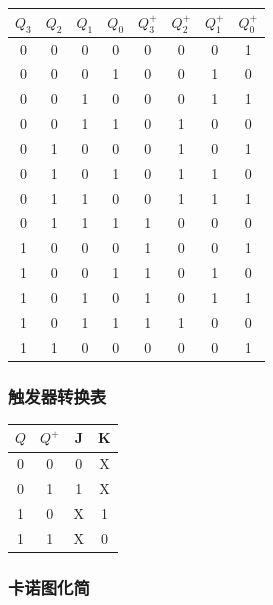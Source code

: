 \documentclass{article}
\begin{document}
\begin{table}[!hbp]
\centering
\begin{tabular}{|c|c|c|c||c|c|c|c|}
\hline
$Q_3$ & $Q_2$ & $Q_1$ & $Q_0$ & $Q_3^+$ & $Q_2^+$ & $Q_1^+$ & $Q_0^+$ \\
\hline
\hline
0 & 0 & 0 & 0 & 0 & 0 & 0 & 1 \\
\hline
0 & 0 & 0 & 1 & 0 & 0 & 1 & 0 \\
\hline
0 & 0 & 1 & 0 & 0 & 0 & 1 & 1 \\
\hline
0 & 0 & 1 & 1 & 0 & 1 & 0 & 0 \\
\hline
0 & 1 & 0 & 0 & 0 & 1 & 0 & 1 \\
\hline
0 & 1 & 0 & 1 & 0 & 1 & 1 & 0 \\
\hline
0 & 1 & 1 & 0 & 0 & 1 & 1 & 1 \\
\hline
0 & 1 & 1 & 1 & 1 & 0 & 0 & 0 \\
\hline
1 & 0 & 0 & 0 & 1 & 0 & 0 & 1 \\
\hline
1 & 0 & 0 & 1 & 1 & 0 & 1 & 0 \\
\hline
1 & 0 & 1 & 0 & 1 & 0 & 1 & 1 \\
\hline
1 & 0 & 1 & 1 & 1 & 1 & 0 & 0 \\
\hline
1 & 1 & 0 & 0 & 0 & 0 & 0 & 1 \\
\hline
\end{tabular}
\end{table}

\subsubsection{触发器转换表}

\begin{table}[!hbp]
\centering
\begin{tabular}{|c|c||c|c|}
\hline
$Q$ & $Q^+$ & J & K \\
\hline
\hline
0 & 0 & 0 & X \\
\hline
0 & 1 & 1 & X \\
\hline
1 & 0 & X & 1 \\
\hline
1 & 1 & X & 0 \\
\hline
\end{tabular}
\end{table}

\newpage

\subsubsection{卡诺图化简}
\end{document}

